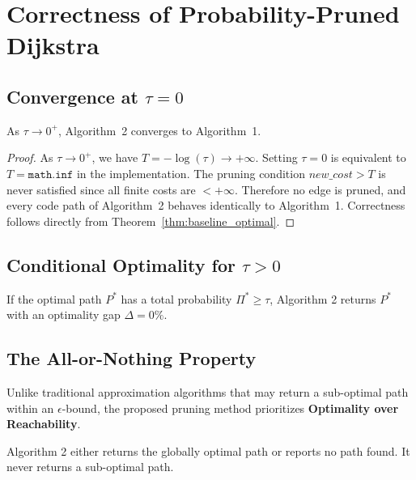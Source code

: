 \section{Correctness of Probability-Pruned Dijkstra}

\subsection{Convergence at \texorpdfstring{$\tau = 0$}{tau = 0}}

\begin{theorem}[Convergence]\label{thm:convergence}
As $\tau \to 0^+$, Algorithm~2 converges to Algorithm~1.
\end{theorem}

\begin{proof}
As $\tau \to 0^+$, we have $T = -\log(\tau) \to +\infty$. Setting $\tau = 0$ is equivalent to $T = \mathtt{math.inf}$ in the implementation. The pruning condition $\mathit{new\_cost} > T$ is never satisfied since all finite costs are $< +\infty$. Therefore no edge is pruned, and every code path of Algorithm~2 behaves identically to Algorithm~1. Correctness follows directly from Theorem~\ref{thm:baseline_optimal}.
\end{proof}

\subsection{Conditional Optimality for \texorpdfstring{$\tau > 0$}{tau > 0}}


\begin{theorem}\label{thm:conditional}
If the optimal path $P^*$ has a total probability $\Pi^* \geq \tau$, Algorithm 2 returns $P^*$ with an optimality gap $\Delta = 0\%$.
\end{theorem}

\subsection{The All-or-Nothing Property}

Unlike traditional approximation algorithms that may return a sub-optimal path within an $\epsilon$-bound, the proposed pruning method prioritizes \textbf{Optimality over Reachability}.

\begin{theorem}\label{thm:all_or_nothing}
Algorithm 2 either returns the globally optimal path or reports no path found. It never returns a sub-optimal path.
\end{theorem}

